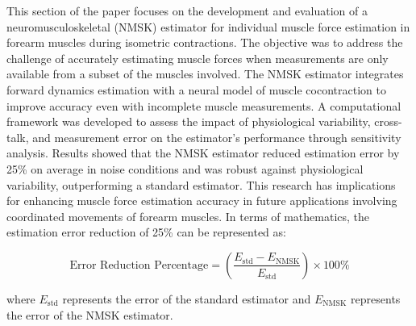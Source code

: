 \documentclass{article}
\begin{document}
This section of the paper focuses on the development and evaluation of a neuromusculoskeletal (NMSK) estimator for individual muscle force estimation in forearm muscles during isometric contractions. The objective was to address the challenge of accurately estimating muscle forces when measurements are only available from a subset of the muscles involved. The NMSK estimator integrates forward dynamics estimation with a neural model of muscle cocontraction to improve accuracy even with incomplete muscle measurements. A computational framework was developed to assess the impact of physiological variability, cross-talk, and measurement error on the estimator's performance through sensitivity analysis. Results showed that the NMSK estimator reduced estimation error by 25\% on average in noise conditions and was robust against physiological variability, outperforming a standard estimator. This research has implications for enhancing muscle force estimation accuracy in future applications involving coordinated movements of forearm muscles. In terms of mathematics, the estimation error reduction of 25\% can be represented as:

\[ \text{Error Reduction Percentage} = \left( \frac{E_{\text{std}} - E_{\text{NMSK}}}{E_{\text{std}}} \right) \times 100\% \]

where \(E_{\text{std}}\) represents the error of the standard estimator and \(E_{\text{NMSK}}\) represents the error of the NMSK estimator.
\end{document}
